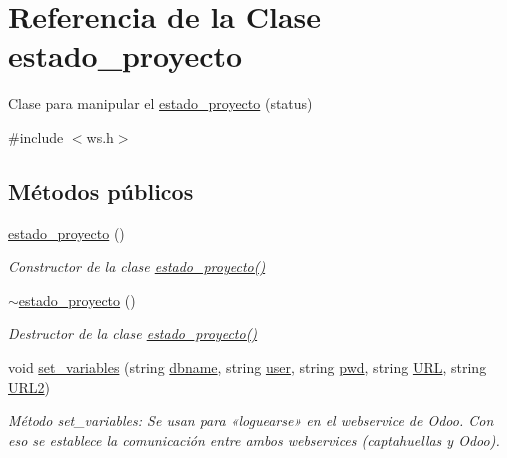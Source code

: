 \hypertarget{classestado__proyecto}{}\section{Referencia de la Clase estado\+\_\+proyecto}
\label{classestado__proyecto}


Clase para manipular el \hyperlink{classestado__proyecto}{estado\+\_\+proyecto} (status)  




{\ttfamily \#include $<$ws.\+h$>$}

\subsection*{Métodos públicos}
\begin{DoxyCompactItemize}
\item 
\hyperlink{classestado__proyecto_a4a6b71e81903d4b3b729acbfc5b4eef8}{estado\+\_\+proyecto} ()
\begin{DoxyCompactList}\small\item\em Constructor de la clase \hyperlink{classestado__proyecto_a4a6b71e81903d4b3b729acbfc5b4eef8}{estado\+\_\+proyecto()} \end{DoxyCompactList}\item 
\hyperlink{classestado__proyecto_afd91dfa4205c3c3af3f7af6e6744c711}{$\sim$estado\+\_\+proyecto} ()
\begin{DoxyCompactList}\small\item\em Destructor de la clase \hyperlink{classestado__proyecto_a4a6b71e81903d4b3b729acbfc5b4eef8}{estado\+\_\+proyecto()} \end{DoxyCompactList}\item 
void \hyperlink{classestado__proyecto_a275a1af5b6d1251c68a11bf2b01d66e3}{set\+\_\+variables} (string \hyperlink{classestado__proyecto_ad68c2876b60b2507510f01291b6a351e}{dbname}, string \hyperlink{classestado__proyecto_a44126a25c5181e9f06b0c831aa4cc2ce}{user}, string \hyperlink{classestado__proyecto_a1dd02106c2ec6c2bba1146e0a4871423}{pwd}, string \hyperlink{classestado__proyecto_aeadf1825e0dafa90f3c33e88e17d3d1c}{U\+RL}, string \hyperlink{classestado__proyecto_af4cd30e97fc087097e738d2ef1d958c9}{U\+R\+L2})
\begin{DoxyCompactList}\small\item\em Método set\+\_\+variables\+: Se usan para «loguearse» en el webservice de Odoo. Con eso se establece la comunicación entre ambos webservices (captahuellas y Odoo). \end{DoxyCompactList}\item 

\end{DoxyCompactItemize}
